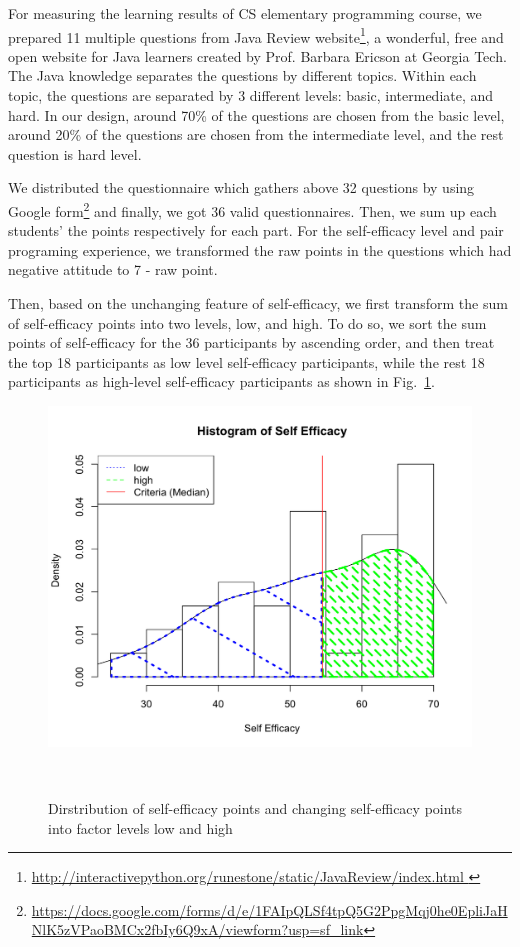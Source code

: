 \documentclass{sigchi}
\begin{document}
For measuring the learning results of CS elementary programming course, we prepared 11 multiple questions from Java Review website\footnote{\url{http://interactivepython.org/runestone/static/JavaReview/index.html }}, a wonderful, free and open website for Java learners created by Prof. Barbara Ericson at Georgia Tech.  The Java knowledge separates the questions by different topics. Within each topic, the questions are separated by 3 different levels: basic, intermediate, and hard. In our design, around 70\% of the questions are chosen from the basic level, around 20\% of the questions are chosen from the intermediate level, and the rest question is hard level. 

We distributed the questionnaire which gathers above 32  questions by using Google form\footnote{\url{https://docs.google.com/forms/d/e/1FAIpQLSf4tpQ5G2PpgMqj0he0EpliJaHNlK5zVPaoBMCx2fbIy6Q9xA/viewform?usp=sf_link}} and finally, we got 36 valid questionnaires. Then, we sum up each students’ the points respectively for each part. For the self-efficacy level and pair programing experience,  we transformed the raw points in the questions which had negative attitude to 7 - raw point. 

Then, based on the unchanging feature of self-efficacy, we first transform the sum of self-efficacy points into two levels, low, and high. To do so, we sort the sum points of self-efficacy for the 36 participants by ascending order, and then treat the top 18 participants as low level self-efficacy participants, while the rest 18 participants as high-level self-efficacy participants as shown in Fig.~\ref{fig:figure1}.

\begin{figure}
\centering
  \includegraphics[width=0.9\columnwidth]{figures/hist1}
  \caption{Dirstribution of self-efficacy points and changing self-efficacy points into  factor levels low and high }~\label{fig:figure1}
\end{figure}
\end{document}
